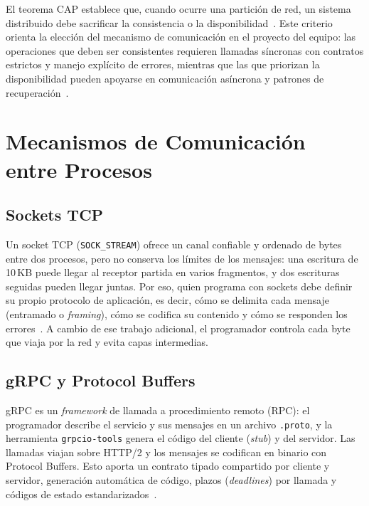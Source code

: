 \documentclass[12pt,a4paper]{article}
\begin{document}
El teorema CAP establece que, cuando ocurre una partición de red, un sistema distribuido debe sacrificar la consistencia o la disponibilidad~\cite{khoshaba2023cap}. Este criterio orienta la elección del mecanismo de comunicación en el proyecto del equipo: las operaciones que deben ser consistentes requieren llamadas síncronas con contratos estrictos y manejo explícito de errores, mientras que las que priorizan la disponibilidad pueden apoyarse en comunicación asíncrona y patrones de recuperación~\cite{mohammad2025resilient}.

\section{Mecanismos de Comunicación entre Procesos}
\label{sec:fundamento_comunicacion}

\subsection{Sockets TCP}

Un socket TCP (\texttt{SOCK\_STREAM}) ofrece un canal confiable y ordenado de bytes entre dos procesos, pero no conserva los límites de los mensajes: una escritura de 10\,KB puede llegar al receptor partida en varios fragmentos, y dos escrituras seguidas pueden llegar juntas. Por eso, quien programa con sockets debe definir su propio protocolo de aplicación, es decir, cómo se delimita cada mensaje (entramado o \emph{framing}), cómo se codifica su contenido y cómo se responden los errores~\cite{liu2022session}. A cambio de ese trabajo adicional, el programador controla cada byte que viaja por la red y evita capas intermedias.

\subsection{gRPC y Protocol Buffers}

gRPC es un \emph{framework} de llamada a procedimiento remoto (RPC): el programador describe el servicio y sus mensajes en un archivo \texttt{.proto}, y la herramienta \texttt{grpcio-tools} genera el código del cliente (\emph{stub}) y del servidor. Las llamadas viajan sobre HTTP/2 y los mensajes se codifican en binario con Protocol Buffers. Esto aporta un contrato tipado compartido por cliente y servidor, generación automática de código, plazos (\emph{deadlines}) por llamada y códigos de estado estandarizados~\cite{zhu2025rethinking}.
\end{document}
